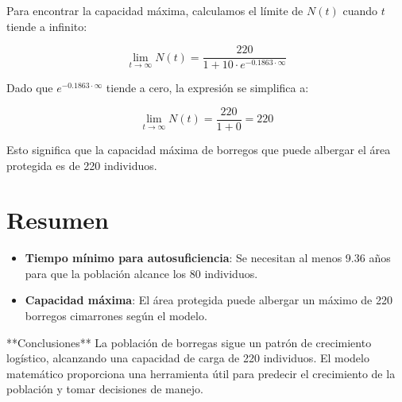     Para encontrar la capacidad máxima, calculamos el límite de \( N(t) \) cuando \( t \) tiende a infinito:
    
    \[
    \lim_{t \to \infty} N(t) = \frac{220}{1 + 10 \cdot e^{-0.1863 \cdot \infty}}
    \]
    
    Dado que \( e^{-0.1863 \cdot \infty} \) tiende a cero, la expresión se simplifica a:
    
    \[
    \lim_{t \to \infty} N(t) = \frac{220}{1 + 0} = 220
    \]
    
    Esto significa que la capacidad máxima de borregos que puede albergar el área protegida es de 220 individuos.
    
    \section*{Resumen}
    
    \begin{itemize}
        \item \textbf{Tiempo mínimo para autosuficiencia}: Se necesitan al menos 9.36 años para que la población alcance los 80 individuos.
        \item \textbf{Capacidad máxima}: El área protegida puede albergar un máximo de 220 borregos cimarrones según el modelo.
    \end{itemize}
    **Conclusiones**
    La población de borregas sigue un patrón de crecimiento logístico, alcanzando una capacidad de carga de 220 individuos. El modelo matemático proporciona una herramienta útil para predecir el crecimiento de la población y tomar decisiones de manejo.
